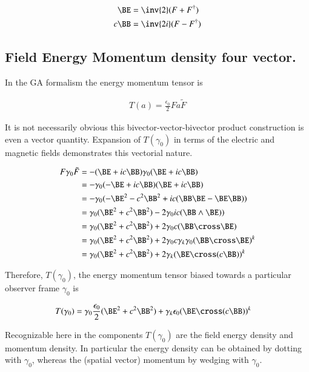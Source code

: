 \begin{align}\label{eqn:maxwellVacuum:conjuagateSplit}
\BE &= \inv{2}(F + F^\dagger) \\
c \BB &= \inv{2i}(F - F^\dagger)
\end{align}

\subsection{Field Energy Momentum density four vector.}

In the GA formalism the energy momentum tensor is

\begin{align}
T(a) = \frac{\epsilon_0}{2} F a \tilde{F}
\end{align}

It is not necessarily obvious this bivector-vector-bivector product construction is even a vector quantity.  Expansion of $T(\gamma_0)$ in terms of the electric and magnetic fields demonstrates this vectorial nature.

\begin{align*}
F \gamma_0 \tilde{F}
&=
-(\BE + i c \BB) \gamma_0 (\BE + i c \BB) \\
&=
-\gamma_0 (-\BE + i c \BB) (\BE + i c \BB) \\
&=
-\gamma_0 (-\BE^2 - c^2 \BB^2 + i c (\BB \BE - \BE \BB) ) \\
&=
\gamma_0 (\BE^2 + c^2 \BB^2) - 2 \gamma_0 i c (\BB \wedge \BE) ) \\
&=
\gamma_0 (\BE^2 + c^2 \BB^2) + 2 \gamma_0 c (\BB \cross \BE) \\
&=
\gamma_0 (\BE^2 + c^2 \BB^2) + 2 \gamma_0 c \gamma_k \gamma_0 (\BB \cross \BE)^k \\
&=
\gamma_0 (\BE^2 + c^2 \BB^2) + 2 \gamma_k (\BE \cross (c \BB))^k \\
\end{align*}

Therefore, $T(\gamma_0)$, the energy momentum tensor biased towards a particular observer frame $\gamma_0$
is

\begin{align}\label{eqn:maxwellVacuum:emFourVect}
T(\gamma_0)
&=
\gamma_0 \frac{\epsilon_0}{2} (\BE^2 + c^2 \BB^2) + \gamma_k \epsilon_0 (\BE \cross (c \BB))^k
\end{align}

Recognizable here in the components $T(\gamma_0)$ are the field energy density and momentum density.  In particular the energy density can be obtained by dotting with $\gamma_0$, whereas the (spatial vector) momentum by wedging with $\gamma_0$.

